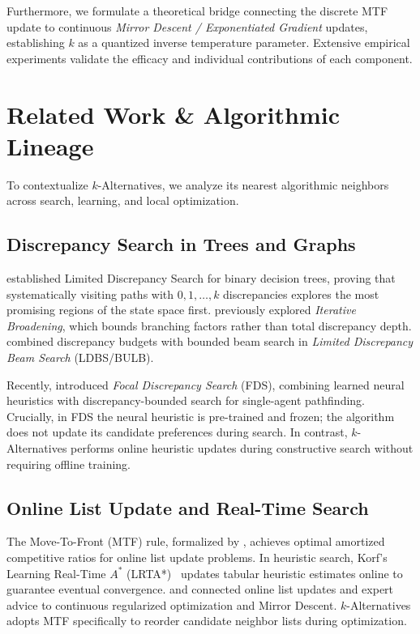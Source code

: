 \documentclass[11pt,a4paper]{article}
\begin{document}
Furthermore, we formulate a theoretical bridge connecting the discrete MTF update to continuous \textit{Mirror Descent / Exponentiated Gradient} updates, establishing $k$ as a quantized inverse temperature parameter. Extensive empirical experiments validate the efficacy and individual contributions of each component.

\section{Related Work \& Algorithmic Lineage}
\label{sec:related}

To contextualize $k$-Alternatives, we analyze its nearest algorithmic neighbors across search, learning, and local optimization.

\subsection{Discrepancy Search in Trees and Graphs}
\citet{harvey1995limited} established Limited Discrepancy Search for binary decision trees, proving that systematically visiting paths with $0, 1, \dots, k$ discrepancies explores the most promising regions of the state space first. \citet{ginsberg1990iterative} previously explored \textit{Iterative Broadening}, which bounds branching factors rather than total discrepancy depth. \citet{furcy2005limited} combined discrepancy budgets with bounded beam search in \textit{Limited Discrepancy Beam Search} (LDBS/BULB). 

Recently, \citet{greco2022focal} introduced \textit{Focal Discrepancy Search} (FDS), combining learned neural heuristics with discrepancy-bounded search for single-agent pathfinding. Crucially, in FDS the neural heuristic is pre-trained and frozen; the algorithm does not update its candidate preferences during search. In contrast, $k$-Alternatives performs online heuristic updates during constructive search without requiring offline training.

\subsection{Online List Update and Real-Time Search}
The Move-To-Front (MTF) rule, formalized by \citet{sleator1985amortized}, achieves optimal amortized competitive ratios for online list update problems. In heuristic search, Korf's Learning Real-Time $A^*$ (LRTA*)~\citep{korf1990real} updates tabular heuristic estimates online to guarantee eventual convergence. \citet{blum1997line} and \citet{kalai2005geometric} connected online list updates and expert advice to continuous regularized optimization and Mirror Descent. $k$-Alternatives adopts MTF specifically to reorder candidate neighbor lists during optimization.
\end{document}
